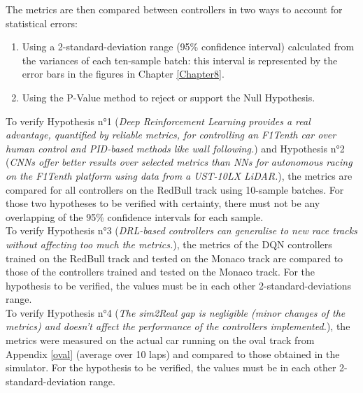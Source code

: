 The metrics are then compared between controllers in two ways to account for statistical errors:
\begin{enumerate}
	\item Using a 2-standard-deviation range (95\% confidence interval) calculated from the variances of each ten-sample batch: this interval is represented by the error bars in the figures in Chapter \ref{Chapter8}.
	\item Using the P-Value method to reject or support the Null Hypothesis.
\end{enumerate}

To verify Hypothesis n°1 (\textit{Deep Reinforcement Learning provides a real advantage, quantified by reliable metrics, for controlling an F1Tenth car over human control and PID-based methods like wall following.}) and Hypothesis n°2 (\textit{CNNs offer better results over selected metrics than NNs for autonomous racing on the F1Tenth platform using data from a UST-10LX LiDAR.}), the metrics are compared for all controllers on the RedBull track using 10-sample batches. For those two hypotheses to be verified with certainty, there must not be any overlapping of the 95\% confidence intervals for each sample. \\
To verify Hypothesis n°3 (\textit{DRL-based controllers can generalise to new race tracks without affecting too much the metrics.}), the metrics of the DQN controllers trained on the RedBull track and tested on the Monaco track are compared to those of the controllers trained and tested on the Monaco track. For the hypothesis to be verified, the values must be in each other 2-standard-deviations range. \\
To verify Hypothesis n°4 (\textit{The sim2Real gap is negligible (minor changes of the metrics) and doesn't affect the performance of the controllers implemented.}), the metrics were measured on the actual car running on the oval track from Appendix \ref{oval} (average over 10 laps) and compared to those obtained in the simulator. For the hypothesis to be verified, the values must be in each other 2-standard-deviation range. 
